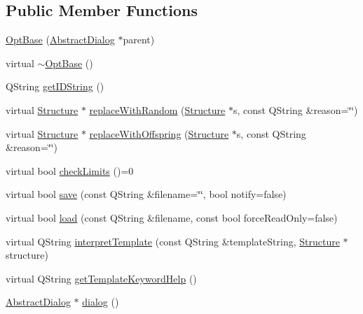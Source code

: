 \subsection*{Public Member Functions}
\begin{DoxyCompactItemize}
\item 
\hyperlink{classGlobalSearch_1_1OptBase_a673110fb0bfe11da3f9f7811744c6578}{Opt\-Base} (\hyperlink{classGlobalSearch_1_1AbstractDialog}{Abstract\-Dialog} $\ast$parent)
\item 
virtual \hyperlink{classGlobalSearch_1_1OptBase_a8b5809d4bb0f97a2bad0ffc05c161f86}{$\sim$\-Opt\-Base} ()
\item 
Q\-String \hyperlink{classGlobalSearch_1_1OptBase_ae4223191dd58c47e186bbdf07f99ef1c}{get\-I\-D\-String} ()
\item 
virtual \hyperlink{classGlobalSearch_1_1Structure}{Structure} $\ast$ \hyperlink{classGlobalSearch_1_1OptBase_a8a370fdd83d4a157bb72fb0c865e31a4}{replace\-With\-Random} (\hyperlink{classGlobalSearch_1_1Structure}{Structure} $\ast$s, const Q\-String \&reason=\char`\"{}\char`\"{})
\item 
virtual \hyperlink{classGlobalSearch_1_1Structure}{Structure} $\ast$ \hyperlink{classGlobalSearch_1_1OptBase_a95ca1cb22a947989817c7cfc952cffbd}{replace\-With\-Offspring} (\hyperlink{classGlobalSearch_1_1Structure}{Structure} $\ast$s, const Q\-String \&reason=\char`\"{}\char`\"{})
\item 
virtual bool \hyperlink{classGlobalSearch_1_1OptBase_a406ca6399df3ef7fa545f3b34f90e0a4}{check\-Limits} ()=0
\item 
virtual bool \hyperlink{classGlobalSearch_1_1OptBase_abfacbe5ffa9d69db4e27bf6db2ad62f7}{save} (const Q\-String \&filename=\char`\"{}\char`\"{}, bool notify=false)
\item 
virtual bool \hyperlink{classGlobalSearch_1_1OptBase_a1d5e689eb327ccaf4c25f64e83e5678b}{load} (const Q\-String \&filename, const bool force\-Read\-Only=false)
\item 
virtual Q\-String \hyperlink{classGlobalSearch_1_1OptBase_a238dbb50b8d7aac7a6660613397565f0}{interpret\-Template} (const Q\-String \&template\-String, \hyperlink{classGlobalSearch_1_1Structure}{Structure} $\ast$structure)
\item 
virtual Q\-String \hyperlink{classGlobalSearch_1_1OptBase_a79650b4bd0dde4580a98a89e7032be96}{get\-Template\-Keyword\-Help} ()
\item 
\hyperlink{classGlobalSearch_1_1AbstractDialog}{Abstract\-Dialog} $\ast$ \hyperlink{classGlobalSearch_1_1OptBase_a3ccbd5949beb6e1efac734da29b726b7}{dialog} ()

\end{DoxyCompactItemize}
